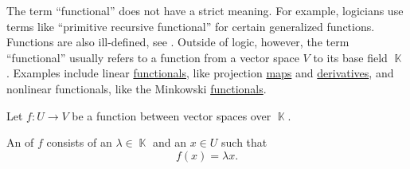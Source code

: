 \begin{remark}\label{rem:functional}
  The term \enquote{functional} does not have a strict meaning. For example, logicians use terms like \enquote{primitive recursive functional} for certain generalized functions. Functions are also ill-defined, see . Outside of logic, however, the term \enquote{functional} usually refers to a function from a vector space \( V \) to its base field \( \BbbK \). Examples include linear \hyperref[def:semimodule/homomorphism]{functionals}, like projection \hyperref[def:module_basis_projection]{maps} and \hyperref[def:differentiability]{derivatives}, and nonlinear functionals, like the Minkowski \hyperref[def:minkowski_functional]{functionals}.
\end{remark}

\begin{definition}\label{def:eigenpair}
  Let \( f: U \to V \) be a function between vector spaces over \( \BbbK \).

  An  of \( f \) consists of an  \( \lambda \in \BbbK \) and an  \( x \in U \) such that
  \begin{equation*}
    f(x) = \lambda x.
  \end{equation*}
\end{definition}
